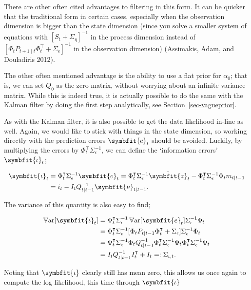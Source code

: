 \documentclass[
]{report}
\DeclareMathOperator{\var}{\mathbb{V}\mathrm{ar}}
\newcommand{\bv}[1]{\symbfit{#1}}
\theoremstyle{plain}
\theoremstyle{plain}
\theoremstyle{plain}
\theoremstyle{remark}
\begin{document}
There are other often cited advantages to filtering in this form. It can
be quicker that the traditional form in certain cases, especially when
the observation dimension is bigger than the state dimension (since you
solve a smaller system of equations with \([S_t + \Sigma_\eta]^{-1}\) in
the process dimension instead of
\([\Phi_t P_{t+1\mid t} \Phi_t^\intercal + \Sigma_\epsilon]^{-1}\) in
the observation dimension) (Assimakis, Adam, and Douladiris 2012).

The other often mentioned advantage is the ability to use a flat prior
for \(\alpha_0\); that is, we can set \(Q_0\) as the zero matrix,
without worrying about an infinite variance matrix. While this is indeed
true, it is actually possible to do the same with the Kalman filter by
doing the first step analytically, see Section~\ref{sec-vagueprior}.

As with the Kalman filter, it is also possible to get the data
likelihood in-line as well. Again, we would like to stick with things in
the state dimension, so working directly with the prediction errors
\(\bv e_t\) should be avoided. Luckily, by multiplying the errors by
\(\Phi_t^\intercal \Sigma_\epsilon^{-1}\), we can define the
`information errors' \(\bv \iota_t\);

\[\begin{split}
  \bv \iota_t &= \Phi_t^\intercal \Sigma_\epsilon^{-1} \bv e_t = \Phi_t^\intercal \Sigma_\epsilon^{-1} \tilde{\bv z}_t -\Phi_t^\intercal \Sigma_\epsilon^{-1}\Phi_t m_{t\mid t-1}\\
  &= i_t - I_tQ_{t\mid t-1}^{-1}\bv \nu_{t\mid t-1}.
\end{split}
\]

The variance of this quantity is also easy to find;

\[\begin{split}
  \var[\bv \iota_t] &= \Phi_t^\intercal \Sigma_\epsilon^{-1}\var[\bv e_t]\Sigma_\epsilon^{-1}\Phi_t\\
  &= \Phi_t^\intercal \Sigma_\epsilon^{-1} [\Phi_{t} P_{t\mid t-1} \Phi_{t}^\intercal + \Sigma_\epsilon] \Sigma_\epsilon^{-1}\Phi_t\\
  &= \Phi_t^\intercal \Sigma_\epsilon^{-1}\Phi_{t} Q_{t\mid t-1}^{-1} \Phi_{t}^\intercal \Sigma_\epsilon^{-1}\Phi_t \Phi_t^\intercal \Sigma_\epsilon^{-1} \Phi_t\\
  &= I_t Q_{t\mid t-1}^{-1} I_t^\intercal + I_t =: \Sigma_{\iota, t}.
\end{split}
\]

Noting that \(\bv \iota\) clearly still has mean zero, this allows us
once again to compute the log likelihood, this time through \(\bv\iota\)
\end{document}
